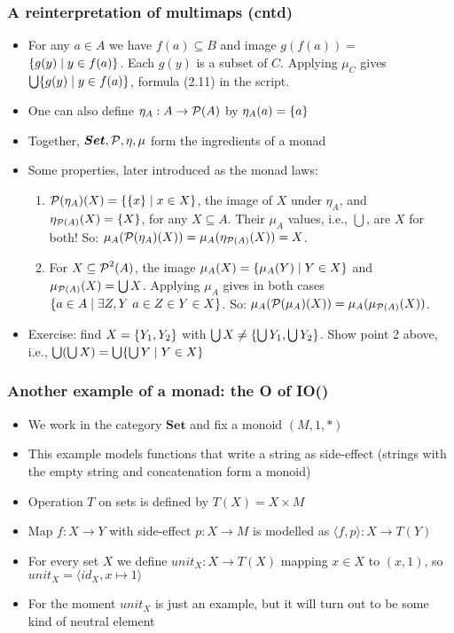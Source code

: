 \documentclass[handout]{beamer}
\newcommand{\bfsf}[1]{{\boldsymbol{#1}}}
\newcommand{\Set}{\bfsf{Set}}
\newcommand{\Kp}[1]{{\langle #1 \rangle}}
\begin{document}
\frame
  {   
    \frametitle{A reinterpretation of multimaps (cntd)}\label{Mon5:MultiMapReint}

 \begin{itemize}[<+->]
\item For any $a\in A$ we have $f(a)\subseteq B$ and {\color{red}image}
$g(f(a)) =$ $ \{g(y) \mid y\in f(a)\}$. Each $g(y)$ is a subset of $C$.
Applying $\mu_C$ gives $\bigcup \{g(y) \mid y\in f(a)\}$, formula (2.11)
in the script.
\item One can also define $\eta_A: A \to \operatorname{\mathcal{P}}(A)$ by $\eta_A(a)=\{a\}$
\item Together, $\Set, \powset, \eta, \mu$ form the ingredients of a monad
\item Some properties, later introduced as the monad laws: 
 \begin{enumerate}
\item $\operatorname{\mathcal{P}}(\eta_A)(X) = \{\{x\}\mid x\in X\}$,
the {\color{red}image} of $X$ under $\eta_A$, and $\eta_{\operatorname{\mathcal{P}}(A)}(X) = \{X\}$,
for any $X\subseteq A$. Their $\mu_A$ values, i.e., $\bigcup$, are $X$ for both!
So: $\mu_A(\operatorname{\mathcal{P}}(\eta_A)(X)) = \mu_A(\eta_{\operatorname{\mathcal{P}}(A)}(X)) = X$.
\item For $X\subseteq \operatorname{\mathcal{P}}^2(A)$, the {\color{red}image} 
$\mu_A(X) = \{\mu_A(Y)\mid Y\in X\}$
and $\mu_{\operatorname{\mathcal{P}}(A)}(X)=\bigcup X$. Applying $\mu_A$ gives in both cases
$\set{a\in A \mid \linebreak \exists Z,Y~a\in Z\in Y \in X}$. 
So: 
$\mu_A(\operatorname{\mathcal{P}}(\mu_A)(X)) = \mu_A(\mu_{\operatorname{\mathcal{P}}(A)}(X))$.
 \end{enumerate}
\item Exercise: find $X=\{Y_1,Y_2\}$ with 
$\bigcup X \neq \{\bigcup Y_1, \bigcup Y_2\}$.
Show point 2 above, i.e., $\bigcup(\bigcup X) = \bigcup \{\bigcup Y \mid Y\in X\}$
 \end{itemize}

 }

\frame
  {   
    \frametitle{Another example of a monad: the O of IO()}\label{Mon5:ExaSetMone}

 \begin{itemize}[<+->]
\item We work in the category $\Set$ and fix a monoid $(M,1,*)$
\item This example models functions that write a string as side-effect
(strings with the empty string and concatenation form a monoid)
\item Operation $T$ on sets is defined by $T(X)= X\times M$
\item Map $f : X\to Y$ with side-effect $p : X\to M$ is modelled as $\Kp{f,p} : X\to T(Y)$
\item For every set $X$ we define $unit_X: X\to T(X)$ mapping $x\in X$ to $(x,1)$,
so $unit_X = \Kp{id_X,x\mapsto 1}$
\item For the moment $unit_X$ is just an example, but it will turn out to
be some kind of neutral element
 \end{itemize}
 }
\end{document}
